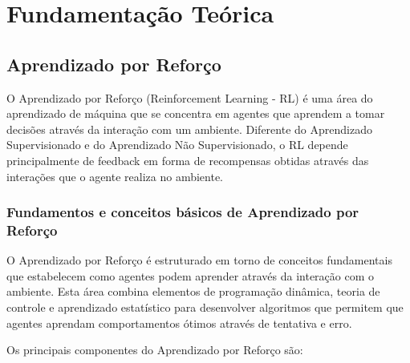 \chapter{Fundamentação Teórica}
\label{cap:fund}

\section{Aprendizado por Reforço}
\label{sec:rl}

O Aprendizado por Reforço (Reinforcement Learning - RL) é uma área do aprendizado de máquina que se concentra em agentes que aprendem a tomar decisões através da interação com um ambiente. Diferente do Aprendizado Supervisionado e do Aprendizado Não Supervisionado, o RL depende principalmente de feedback em forma de recompensas obtidas através das interações que o agente realiza no ambiente.

\subsection{Fundamentos e conceitos básicos de Aprendizado por Reforço}
\label{subsec:rl_fund}

O Aprendizado por Reforço é estruturado em torno de conceitos fundamentais que estabelecem como agentes podem aprender através da interação com o ambiente. Esta área combina elementos de programação dinâmica, teoria de controle e aprendizado estatístico para desenvolver algoritmos que permitem que agentes aprendam comportamentos ótimos através de tentativa e erro.

Os principais componentes do Aprendizado por Reforço são:

